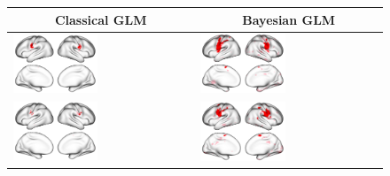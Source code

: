 \documentclass{article}
\begin{document}
\begin{figure}
	\begin{tabularx}{\textwidth}{|X|X|}
		\multicolumn{1}{c}{\textbf{Classical GLM}} & \multicolumn{1}{c}{\textbf{Bayesian GLM}}  \\ \hline
		\includegraphics[width=0.48\textwidth]{plots/603_subject_103818_thr05_alpha001_num_active_classical.png} &
		\includegraphics[width=0.48\textwidth]{plots/603_subject_103818_thr05_alpha001_num_active.png} \\ \hline
		\includegraphics[width=0.48\textwidth]{plots/603_subject_105923_thr05_alpha001_num_active_classical.png} &
		\includegraphics[width=0.48\textwidth]{plots/603_subject_105923_thr05_alpha001_num_active.png} \\ \hline

\end{tabularx}
\end{figure}
\end{document}
